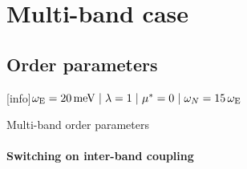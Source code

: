 \documentclass[10pt]{beamer}
\def\sep{\hspace{3pt}|\hspace{3pt}}
\begin{document}
    \section{Multi-band case}

    \subsection{Order parameters}

    [info]{$%
        \omega \sub E = 20 \, \unit{meV} \sep \lambda = 1 \sep \mu^* = 0 \sep
        \omega_N = 15 \, \omega \sub E$}

    \begin{frame}[label=order-parameters]{Multi-band order parameters}
        \framesubtitle{Switching on inter-band coupling}
        \begin{figure}
            \small
        \end{figure}
    \end{frame}
\end{document}
